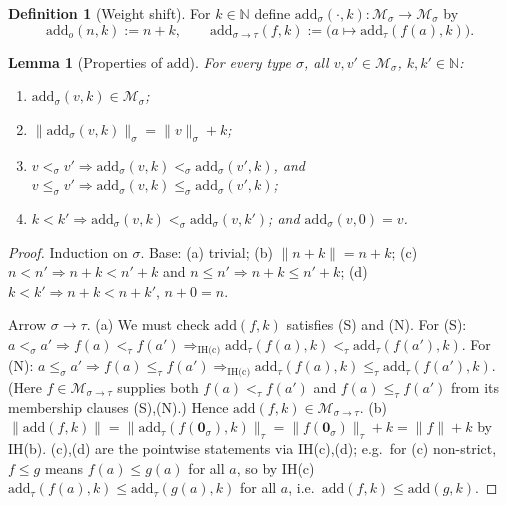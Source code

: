 \documentclass{amsart}
\newtheorem{lemma}{Lemma}
\theoremstyle{definition}
\newtheorem{definition}{Definition}
\begin{document}
\begin{definition}[Weight shift]\label{def:add}
For $k\in\mathbb N$ define $\mathrm{add}_\sigma(\cdot,k):\mathcal M_\sigma\to\mathcal M_\sigma$ by
\[
  \mathrm{add}_o(n,k):=n+k,\qquad
  \mathrm{add}_{\sigma\to\tau}(f,k):=\bigl(a\mapsto\mathrm{add}_\tau(f(a),k)\bigr).
\]
\end{definition}

\begin{lemma}[Properties of $\mathrm{add}$]\label{lem:add}
For every type $\sigma$, all $v,v'\in\mathcal M_\sigma$, $k,k'\in\mathbb N$:
\begin{enumerate}
\item[(a)] $\mathrm{add}_\sigma(v,k)\in\mathcal M_\sigma$;
\item[(b)] $\|\mathrm{add}_\sigma(v,k)\|_\sigma=\|v\|_\sigma+k$;
\item[(c)] $v<_\sigma v'\Rightarrow\mathrm{add}_\sigma(v,k)<_\sigma\mathrm{add}_\sigma(v',k)$,
  and $v\le_\sigma v'\Rightarrow\mathrm{add}_\sigma(v,k)\le_\sigma\mathrm{add}_\sigma(v',k)$;
\item[(d)] $k<k'\Rightarrow\mathrm{add}_\sigma(v,k)<_\sigma\mathrm{add}_\sigma(v,k')$;
  and $\mathrm{add}_\sigma(v,0)=v$.
\end{enumerate}
\end{lemma}

\begin{proof}
Induction on $\sigma$. Base: (a) trivial; (b) $\|n+k\|=n+k$; (c) $n<n'\Rightarrow n+k<n'+k$
and $n\le n'\Rightarrow n+k\le n'+k$; (d) $k<k'\Rightarrow n+k<n+k'$, $n+0=n$.

Arrow $\sigma\to\tau$. (a) We must check $\mathrm{add}(f,k)$ satisfies (S) and (N). For (S):
$a<_\sigma a'\Rightarrow f(a)<_\tau f(a')\Rightarrow_{\text{IH(c)}}
\mathrm{add}_\tau(f(a),k)<_\tau\mathrm{add}_\tau(f(a'),k)$. For (N): $a\le_\sigma a'\Rightarrow
f(a)\le_\tau f(a')\Rightarrow_{\text{IH(c)}}\mathrm{add}_\tau(f(a),k)\le_\tau
\mathrm{add}_\tau(f(a'),k)$. (Here $f\in\mathcal M_{\sigma\to\tau}$ supplies both
$f(a)<_\tau f(a')$ and $f(a)\le_\tau f(a')$ from its membership clauses (S),(N).) Hence
$\mathrm{add}(f,k)\in\mathcal M_{\sigma\to\tau}$.
(b) $\|\mathrm{add}(f,k)\|=\|\mathrm{add}_\tau(f(\mathbf 0_\sigma),k)\|_\tau=
\|f(\mathbf 0_\sigma)\|_\tau+k=\|f\|+k$ by IH(b). (c),(d) are the pointwise statements via
IH(c),(d); e.g.\ for (c) non-strict, $f\le g$ means $f(a)\le g(a)$ for all $a$, so by IH(c)
$\mathrm{add}_\tau(f(a),k)\le\mathrm{add}_\tau(g(a),k)$ for all $a$, i.e.\
$\mathrm{add}(f,k)\le\mathrm{add}(g,k)$.
\end{proof}
\end{document}
